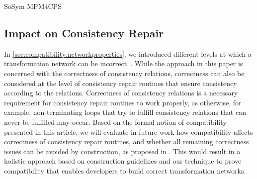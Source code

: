 \begin{copiedFrom}{SoSym MPM4CPS}
\subsection{Impact on Consistency Repair}
In \autoref{sec:compatibility:networkproperties}, we introduced different levels at which a transformation network can be incorrect~\cite{klare2019icmt}.
While the approach in this paper is concerned with the correctness of consistency relations, %
correctness can also be considered at the level of consistency repair routines that ensure consistency according to the relations.
Correctness of consistency relations is a necessary requirement for consistency repair routines to work properly, as otherwise, for example, non-terminating loops that try to fulfill consistency relations that can never be fulfilled may occur.
Based on the formal notion of compatibility presented in this article, we will evaluate in future work how compatibility affects correctness of consistency repair routines, and whether all remaining correctness issues can be avoided by construction, as proposed in \cite{klare2019icmt}.
This would result in a holistic approach based on construction guidelines and our technique to prove compatibility that enables developers to build correct transformation networks.



\end{copiedFrom}
